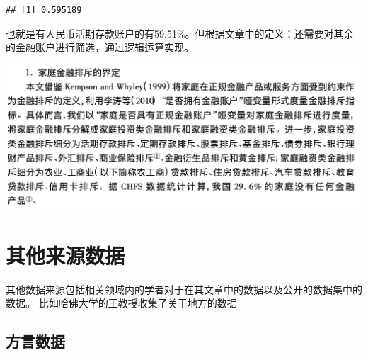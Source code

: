 \documentclass[
  oneside]{book}
\newenvironment{Shaded}{\begin{snugshade}}{\end{snugshade}}
\newcommand{\AttributeTok}[1]{\textcolor[rgb]{0.77,0.63,0.00}{#1}}
\newcommand{\DecValTok}[1]{\textcolor[rgb]{0.00,0.00,0.81}{#1}}
\newcommand{\FunctionTok}[1]{\textcolor[rgb]{0.00,0.00,0.00}{#1}}
\newcommand{\NormalTok}[1]{#1}
\newcommand{\OtherTok}[1]{\textcolor[rgb]{0.56,0.35,0.01}{#1}}
\newcommand{\SpecialCharTok}[1]{\textcolor[rgb]{0.00,0.00,0.00}{#1}}
\begin{document}
\begin{Shaded}
\end{Shaded}

\begin{verbatim}
## [1] 0.595189
\end{verbatim}

也就是有人民币活期存款账户的有59.51\%。但根据文章中的定义：还需要对其余的金融账户进行筛选，通过逻辑运算实现。

\includegraphics{image/exclude.png}

\hypertarget{ux5176ux4ed6ux6765ux6e90ux6570ux636e}{%
\chapter{其他来源数据}\label{ux5176ux4ed6ux6765ux6e90ux6570ux636e}}

其他数据来源包括相关领域内的学者对于在其文章中的数据以及公开的数据集中的数据。
比如哈佛大学的王教授收集了关于地方的数据

\hypertarget{ux65b9ux8a00ux6570ux636e}{%
\section{方言数据}\label{ux65b9ux8a00ux6570ux636e}}
\end{document}
